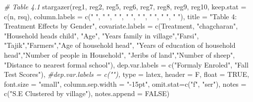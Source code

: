 \documentclass[
]{article}
\newenvironment{Shaded}{\begin{snugshade}}{\end{snugshade}}
\newcommand{\AttributeTok}[1]{\textcolor[rgb]{0.77,0.63,0.00}{#1}}
\newcommand{\CommentTok}[1]{\textcolor[rgb]{0.56,0.35,0.01}{\textit{#1}}}
\newcommand{\ConstantTok}[1]{\textcolor[rgb]{0.00,0.00,0.00}{#1}}
\newcommand{\FunctionTok}[1]{\textcolor[rgb]{0.00,0.00,0.00}{#1}}
\newcommand{\NormalTok}[1]{#1}
\newcommand{\StringTok}[1]{\textcolor[rgb]{0.31,0.60,0.02}{#1}}
\begin{document}
\begin{Shaded}
\begin{Highlighting}[]
\CommentTok{\# Table 4.1}
\FunctionTok{stargazer}\NormalTok{(reg1, reg2, reg5, reg6, reg7, reg8, reg9, reg10, }
          \AttributeTok{keep.stat =} \FunctionTok{c}\NormalTok{(}\StringTok{\textquotesingle{}n\textquotesingle{}}\NormalTok{, }\StringTok{\textquotesingle{}rsq\textquotesingle{}}\NormalTok{), }
          \AttributeTok{column.labels =} \FunctionTok{c}\NormalTok{(}\StringTok{"      "}\NormalTok{, }\StringTok{"      "}\NormalTok{, }\StringTok{"      "}\NormalTok{, }\StringTok{"      "}\NormalTok{,}
                            \StringTok{"      "}\NormalTok{, }\StringTok{"      "}\NormalTok{, }\StringTok{"      "}\NormalTok{, }\StringTok{"      "}\NormalTok{),}
          \AttributeTok{title =} \StringTok{"Table 4: Treatment Effects by Gender"}\NormalTok{,}
          \AttributeTok{covariate.labels =} \FunctionTok{c}\NormalTok{(}\StringTok{\textquotesingle{}Treatment\textquotesingle{}}\NormalTok{, }\StringTok{"chagcharan"}\NormalTok{, }
                               \StringTok{"Household head\textquotesingle{}s child"}\NormalTok{,  }\StringTok{"Age"}\NormalTok{,}
                               \StringTok{"Years family in village"}\NormalTok{,}\StringTok{"Farsi"}\NormalTok{,}
                               \StringTok{"Tajik"}\NormalTok{,}\StringTok{"Farmers"}\NormalTok{,}\StringTok{"Age of household head"}\NormalTok{, }
                               \StringTok{"Years of education of household head"}\NormalTok{,}\StringTok{"Number of people in Household"}\NormalTok{,}
                               \StringTok{"Jeribs of land"}\NormalTok{,}\StringTok{"Number of sheep"}\NormalTok{,}
                               \StringTok{"Distance to nearest formal school"}\NormalTok{),}
          \AttributeTok{dep.var.labels =} \FunctionTok{c}\NormalTok{(}\StringTok{"Formaly Enroled"}\NormalTok{, }\StringTok{"Fall Test Scores"}\NormalTok{), }
          \CommentTok{\#dep.var.labels = c(""), }
          \AttributeTok{type =} \StringTok{\textquotesingle{}latex\textquotesingle{}}\NormalTok{, }\AttributeTok{header =}\NormalTok{ F, }\AttributeTok{float =} \ConstantTok{TRUE}\NormalTok{, }
          \AttributeTok{font.size =} \StringTok{"small"}\NormalTok{,}
          \AttributeTok{column.sep.width =} \StringTok{"{-}15pt"}\NormalTok{,}
          \AttributeTok{omit.stat=}\FunctionTok{c}\NormalTok{(}\StringTok{"f"}\NormalTok{, }\StringTok{"ser"}\NormalTok{),}
          \AttributeTok{notes =} \FunctionTok{c}\NormalTok{(}\StringTok{"S.E Clustered by village"}\NormalTok{), }\AttributeTok{notes.append =} \ConstantTok{FALSE}\NormalTok{)}
\end{Highlighting}
\end{Shaded}
\end{document}
